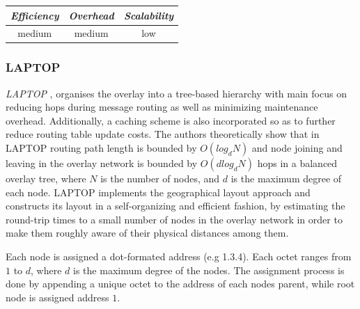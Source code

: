 \begin{center}
\begin{tabular}{ccc}
\emph{Efficiency} & \emph{Overhead} & \emph{Scalability} \\
\hline
medium &
medium &
low
\end{tabular}
\end{center}

\subsubsection{LAPTOP}
\emph{LAPTOP} \cite{wu_laptop_2007}, organises the overlay into a tree-based
hierarchy with main focus on reducing hops during message routing as well as
minimizing maintenance overhead. Additionally, a caching scheme is also
incorporated so as to further reduce routing table update costs. The authors
theoretically show that in LAPTOP routing path length is bounded by $O(log_d N)$
and node joining and leaving in the overlay network is bounded by
$O\left( d log_d N \right)$ hops in a balanced overlay tree, where $N$ is the
number of nodes, and $d$ is the maximum degree of each node. LAPTOP implements
the geographical layout approach  and constructs its layout in a self-organizing
and efficient fashion, by estimating the round-trip times to a small number of
nodes in the overlay network in order to make them roughly aware of their
physical distances among them.

Each node is assigned a dot-formated address (e.g 1.3.4). Each octet ranges from
$1$ to $d$, where $d$ is the maximum degree of the nodes. The assignment process
is done by appending a unique octet to the address of each nodes parent, while
root node is assigned address $1$.

